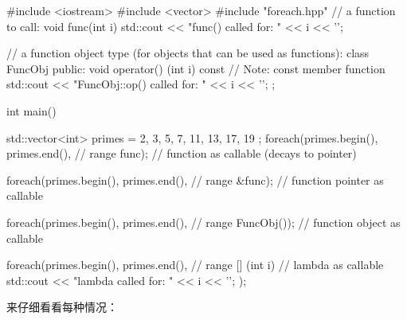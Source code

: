 \begin{cpp}
#include <iostream>
#include <vector>
#include "foreach.hpp"
// a function to call:
void func(int i) {
	std::cout << "func() called for: " << i << '\n';
}

// a function object type (for objects that can be used as functions):
class FuncObj {
	public:
	void operator() (int i) const { // Note: const member function
		std::cout << "FuncObj::op() called for: " << i << '\n';
	}
};

int main() {
	std::vector<int> primes = { 2, 3, 5, 7, 11, 13, 17, 19 };
	foreach(primes.begin(), primes.end(), // range
			func); // function as callable (decays to pointer)

	foreach(primes.begin(), primes.end(), // range
			&func); // function pointer as callable

	foreach(primes.begin(), primes.end(), // range
			FuncObj()); // function object as callable

	foreach(primes.begin(), primes.end(), // range
			[] (int i) { // lambda as callable
				std::cout << "lambda called for: " << i << '\n';
			});
}
\end{cpp}

来仔细看看每种情况：

